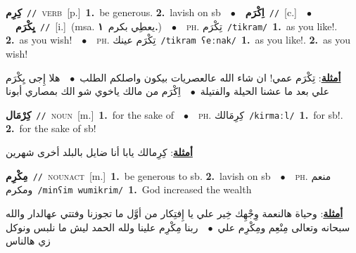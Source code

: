 \documentclass[10pt,a4paper,twoside]{article} %
\begin{document}
\begin{multicols}{2}
{\setlength\topsep{0pt}\textbf{\foreignlanguage{arabic}{كِرِم}}\ {\color{gray}\texttt{//}\color{black}}\ \textsc{verb}\ [p.]\ \textbf{1.}~be generous.  \textbf{2.}~lavish on sb\ \ $\bullet$\ \ \setlength\topsep{0pt}\textbf{\foreignlanguage{arabic}{اِكْرَم}}\ {\color{gray}\texttt{//}\color{black}}\ [c.]\ \ $\bullet$\ \ \setlength\topsep{0pt}\textbf{\foreignlanguage{arabic}{يِكْرَم}}\ {\color{gray}\texttt{//}\color{black}}\ [i.]\ \color{gray}(msa. \foreignlanguage{arabic}{يعطِي بكرم}~\foreignlanguage{arabic}{\textbf{١.}})\color{black}\ \ $\bullet$\ \ \textsc{ph.} \color{gray} \foreignlanguage{arabic}{تِكْرَم}\color{black}\ {\color{gray}\texttt{/{\sffamily tikram}/}\color{black}}\ \textbf{1.}~as you like!.  \textbf{2.}~as you wish!\ \ $\bullet$\ \ \textsc{ph.} \color{gray} \foreignlanguage{arabic}{تِكْرَم عينك}\color{black}\ {\color{gray}\texttt{/{\sffamily tikram ʕeːnak}/}\color{black}}\ \textbf{1.}~as you like!.  \textbf{2.}~as you wish!\  \begin{flushright}\color{gray}\foreignlanguage{arabic}{\textbf{\underline{\foreignlanguage{arabic}{أمثلة}}}: تِكْرَم عمي! ان شاء الله عالعصريات بيكون واصلكم الطلب\ $\bullet$\ \  هلا إِجى يِكْرَم علي بعد ما عشنا الحيلة والفتيلة\ $\bullet$\ \  اِكْرَم من مالك ياخوي شو الك بمصاري أبونا}\end{flushright}\color{black}} \vspace{2mm}

{\setlength\topsep{0pt}\textbf{\foreignlanguage{arabic}{كِرْمَال}}\ {\color{gray}\texttt{//}\color{black}}\ \textsc{noun}\ [m.]\ \textbf{1.}~for the sake of\ \ $\bullet$\ \ \textsc{ph.} \color{gray} \foreignlanguage{arabic}{كِرِمَالك}\color{black}\ {\color{gray}\texttt{/{\sffamily kirmaːl}/}\color{black}}\ \textbf{1.}~for sb!.  \textbf{2.}~for the sake of sb!\  \begin{flushright}\color{gray}\foreignlanguage{arabic}{\textbf{\underline{\foreignlanguage{arabic}{أمثلة}}}: كِرِمالك يابا أنا ضايل بالبلد أخرى شهرين}\end{flushright}\color{black}} \vspace{2mm}

{\setlength\topsep{0pt}\textbf{\foreignlanguage{arabic}{مِكْرِم}}\ {\color{gray}\texttt{//}\color{black}}\ \textsc{noun\textunderscore act}\ [m.]\ \textbf{1.}~be generous to sb.  \textbf{2.}~lavish on sb\ \ $\bullet$\ \ \textsc{ph.} \color{gray} \foreignlanguage{arabic}{منعم ومكرم}\color{black}\ {\color{gray}\texttt{/{\sffamily minʕim wumikrim}/}\color{black}}\ \textbf{1.}~God increased the wealth\  \begin{flushright}\color{gray}\foreignlanguage{arabic}{\textbf{\underline{\foreignlanguage{arabic}{أمثلة}}}: وحياة هالنعمة وِجْهِك خِير علي يا إِفتِكار من أوَّل ما تجوزنا وفتتي عهالدار والله سبحانه وتعالى مِنْعِم ومِكْرِم علي\ $\bullet$\ \  ربنا مِكْرِم علينا ولله الحمد ليش ما نلبس ونوكل زي هالناس}\end{flushright}\color{black}} \vspace{2mm}


\end{multicols}
\end{document}
